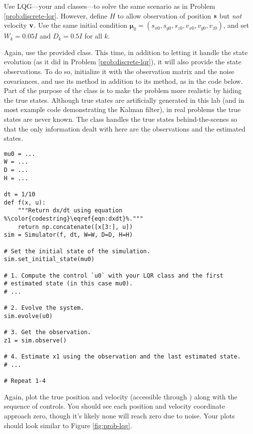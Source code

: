 \begin{problem}
Use LQG---your  and  classes---to solve the same scenario as in Problem \ref{prob:discrete-lqr}.
However, define $H$ to allow observation of position $\mathbf s$ but \emph{not} velocity $\mathbf{v}$.
Use the same initial condition $\boldsymbol \mu_0 = (s_{x0}, s_{y0}, s_{z0}, v_{x0}, v_{y0}, v_{z0})$, and set $W_k = 0.05 I$ and $D_k = 0.5 I$ for all $k$.

Again, use the provided  class.
This time, in addition to letting it handle the state evolution (as it did in Problem \ref{prob:discrete-lqr}), it will also provide the state observations.
To do so, initialize it with the observation matrix and the noise covariances, and use its  method in addition to its  method, as in the code below.
Part of the purpose of the  class is to make the problem more realistic by hiding the true states.
Although true states are artificially generated in this lab (and in most example code demonstrating the Kalman filter), in real problems the true states are never known.
The  class handles the true states behind-the-scenes so that the only information dealt with here are the observations and the estimated states.

\begin{lstlisting}[escapechar=\%]
mu0 = ...
W = ...
D = ...
H = ...

dt = 1/10
def f(x, u):
    """Return dx/dt using equation %\color{codestring}\eqref{eqn:dxdt}%."""
    return np.concatenate([x[3:], u])
sim = Simulator(f, dt, W=W, D=D, H=H)

# Set the initial state of the simulation.
sim.set_initial_state(mu0)

# 1. Compute the control `u0` with your LQR class and the first
# estimated state (in this case mu0).
# ...

# 2. Evolve the system.
sim.evolve(u0)

# 3. Get the observation.
z1 = sim.observe()

# 4. Estimate x1 using the observation and the last estimated state.
# ...

# Repeat 1-4
\end{lstlisting}

Again, plot the true position and velocity (accessible through ) along with the sequence of controls.
You should see each position and velocity coordinate approach zero, though it's likely none will reach zero due to noise.
Your plots should look similar to Figure \ref{fig:prob-lqg}.

\label{prob:lqg}
\end{problem}

